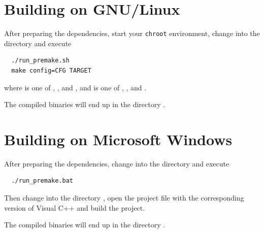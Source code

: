 \section{Building on GNU/Linux}

After preparing the dependencies, start your \texttt{chroot}
environment, change into the directory  and execute

\begin{verbatim}
  ./run_premake.sh
  make config=CFG TARGET
\end{verbatim}

where  is one of ,
,  and
, and  is one of
,
,
 and
.

The compiled binaries will end up in the directory .

\section{Building on Microsoft Windows}

After preparing the dependencies, change into the directory
 and execute

\begin{verbatim}
  ./run_premake.bat
\end{verbatim}

Then change into the directory , open the
project file with the corresponding version of Visual C++ and build
the project.

The compiled binaries will end up in the directory .







